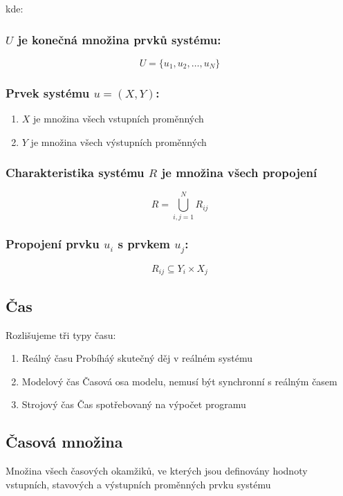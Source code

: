 \documentclass[11pt]{article}
\begin{document}
kde:
\subsubsection{\(U\) je konečná množina prvků systému:}
\label{sec:orgda291ef}
\[U = \{u_1, u_2, \dots, u_N\}\]

\subsubsection{Prvek systému \(u = (X, Y)\):}
\label{sec:orgff82b24}
\begin{enumerate}
\item \(X\) je množina všech vstupních proměnných
\label{sec:orgb126f38}
\item \(Y\) je množina všech výstupních proměnných
\label{sec:orgc59f790}
\end{enumerate}

\subsubsection{Charakteristika systému \(R\) je množina všech propojení}
\label{sec:org6212db6}
\[R = \bigcup^{N}_{i,j=1} R_{ij}\]

\subsubsection{Propojení prvku \(u_i\) s prvkem \(u_j\):}
\label{sec:orgd1da6ac}
\[R_{ij} \subseteq Y_i \times X_j\]

\subsection{Čas}
\label{sec:org2bc4f11}
Rozlišujeme tři typy času:
\begin{enumerate}
\item Reálný času
Probíháý skutečný děj v reálném systému
\item Modelový čas
Časová osa modelu, nemusí být synchronní s reálným časem
\item Strojový čas
Čas spotřebovaný na výpočet programu
\end{enumerate}

\subsection{Časová množina}
\label{sec:orga8fd394}
Množina všech časových okamžiků, ve kterých jsou definovány hodnoty vstupních,
stavových a výstupních proměnných prvku systému
\end{document}
